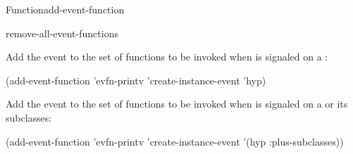 \documentclass[10pt,twoside,english,pdftex]{article}
\begin{document}
\begin{functiondoc}{Function}{add-event-function}
\begin{alsos}{remove-all-event-functions}
\end{alsos}

\fnexamples
{}%
Add the event   to the set of functions
to be invoked when  is signaled on a
 :
%
\W\supp
\begin{example}
  (add-event-function 'evfn-printv 'create-instance-event 'hyp)
\end{example}
%
Add the event   to the set of functions
to be invoked when  is signaled on a
  or its subclasses:
%
\W\supp\notpretop
\begin{example}
  (add-event-function 'evfn-printv 'create-instance-event '(hyp :plus-subclasses))
\end{example}

\fnnote
\instanceevfnsnyi

\end{functiondoc}

\end{document}

